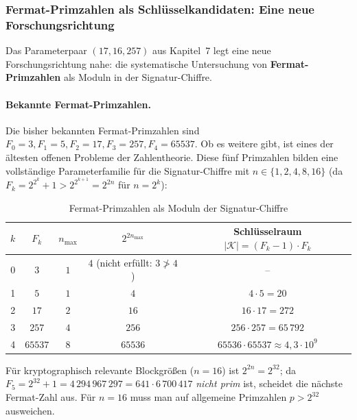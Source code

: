 ﻿\documentclass[a4paper,12pt]{scrreprt}
\theoremstyle{definition}
\begin{document}
\subsubsection{Fermat-Primzahlen als Schlüsselkandidaten: Eine neue Forschungsrichtung}

Das Parameterpaar $(17, 16, 257)$ aus Kapitel~7 legt eine neue Forschungsrichtung nahe: die systematische Untersuchung von \textbf{Fermat-Primzahlen} als Moduln in der Signatur-Chiffre.

\paragraph{Bekannte Fermat-Primzahlen.}
Die bisher bekannten Fermat-Primzahlen sind $F_0=3, F_1=5, F_2=17, F_3=257, F_4=65537$. Ob es weitere gibt, ist eines der ältesten offenen Probleme der Zahlentheorie. Diese fünf Primzahlen bilden eine vollständige Parameterfamilie für die Signatur-Chiffre mit $n \in \{1, 2, 4, 8, 16\}$ (da $F_k = 2^{2^k}+1 > 2^{2^{k+1}} = 2^{2n}$ für $n = 2^k$):

\begin{table}[H]
\centering
\caption{Fermat-Primzahlen als Moduln der Signatur-Chiffre}
\label{tab:fermat}
\begin{tabular}{@{}ccccc@{}}
\toprule
$k$ & $F_k$ & $n_{\max}$ & $2^{2n_{\max}}$ & Schlüsselraum $|\mathcal{K}| = (F_k-1)\cdot F_k$ \\
\midrule
0 & $3$      & $1$ & $4$ (nicht erfüllt: $3 \not> 4$) & -- \\
1 & $5$      & $1$ & $4$ & $4 \cdot 5 = 20$ \\
2 & $17$     & $2$ & $16$ & $16 \cdot 17 = 272$ \\
3 & $257$    & $4$ & $256$ & $256 \cdot 257 = 65\,792$ \\
4 & $65537$  & $8$ & $65536$ & $65536 \cdot 65537 \approx 4{,}3 \cdot 10^9$ \\
\bottomrule
\end{tabular}
\end{table}

Für kryptographisch relevante Blockgrößen ($n = 16$) ist $2^{2n} = 2^{32}$; da $F_5 = 2^{32}+1 = 4\,294\,967\,297 = 641 \cdot 6\,700\,417$ \emph{nicht prim} ist, scheidet die nächste Fermat-Zahl aus. Für $n=16$ muss man auf allgemeine Primzahlen $p > 2^{32}$ ausweichen.
\end{document}
